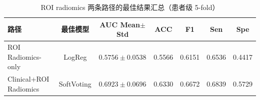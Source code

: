 \begin{table}[H]
\centering
\caption{ROI radiomics 两条路径的最佳结果汇总（患者级 5-fold）}
\label{tab:traditional_radiomics}
\small
\begin{tabular}{lcccccc}
\toprule
路径 & 最佳模型 & AUC Mean$\pm$Std & ACC & F1 & Sen & Spe \\
\midrule
ROI Radiomics-only & LogReg & $0.5756\pm0.0538$ & 0.5566 & 0.6151 & 0.6536 & 0.4417 \\
Clinical+ROI Radiomics & SoftVoting & $0.6923\pm0.0696$ & 0.6330 & 0.6672 & 0.6839 & 0.5729 \\
\bottomrule
\end{tabular}
\end{table}
